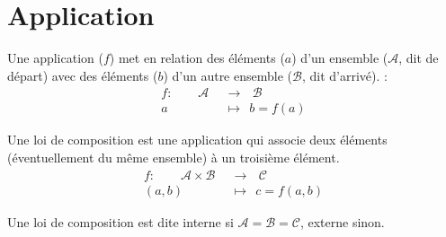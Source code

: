 \section{Application}
Une application ($f$) met en relation des éléments ($a$) d'un ensemble ($\mathcal{A}$, dit de départ) avec des éléments ($b$) d'un autre ensemble ($\mathcal{B}$, dit d'arrivé). :
\begin{align*}
f :\ \ \ \ \ \ \ \ \ \mathcal{A} \ \  & \rightarrow \ \ \ \mathcal{B} \\
a \ \ & \mapsto \ \ b = f(a)
\end{align*}

Une loi de composition est une application qui associe deux éléments (éventuellement du même ensemble) à un troisième élément. 
\begin{align*}
f :\ \ \ \ \ \ \ \ \ \mathcal{A} \times \mathcal{B} \ \  & \rightarrow \ \ \ \mathcal{C} \\
(a,b) \ \ & \mapsto \ \ c = f(a,b)
\end{align*}

Une loi de composition est dite interne si $\mathcal{A} = \mathcal{B} = \mathcal{C}$, externe sinon.

